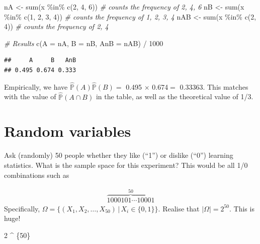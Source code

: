 \documentclass[
]{book}
\newenvironment{Shaded}{\begin{snugshade}}{\end{snugshade}}
\newcommand{\AttributeTok}[1]{\textcolor[rgb]{0.77,0.63,0.00}{#1}}
\newcommand{\CommentTok}[1]{\textcolor[rgb]{0.56,0.35,0.01}{\textit{#1}}}
\newcommand{\DecValTok}[1]{\textcolor[rgb]{0.00,0.00,0.81}{#1}}
\newcommand{\FunctionTok}[1]{\textcolor[rgb]{0.00,0.00,0.00}{#1}}
\newcommand{\NormalTok}[1]{#1}
\newcommand{\OtherTok}[1]{\textcolor[rgb]{0.56,0.35,0.01}{#1}}
\newcommand{\SpecialCharTok}[1]{\textcolor[rgb]{0.00,0.00,0.00}{#1}}
\newcommand{\bbP}{\mathbb{P}}
\theoremstyle{definition}
\theoremstyle{definition}
\theoremstyle{definition}
\theoremstyle{definition}
\theoremstyle{remark}
\begin{document}
\begin{Shaded}
\begin{Highlighting}[]
\NormalTok{nA }\OtherTok{\textless{}{-}} \FunctionTok{sum}\NormalTok{(x }\SpecialCharTok{\%in\%} \FunctionTok{c}\NormalTok{(}\DecValTok{2}\NormalTok{, }\DecValTok{4}\NormalTok{, }\DecValTok{6}\NormalTok{))  }\CommentTok{\# counts the frequency of 2, 4, 6}
\NormalTok{nB }\OtherTok{\textless{}{-}} \FunctionTok{sum}\NormalTok{(x }\SpecialCharTok{\%in\%} \FunctionTok{c}\NormalTok{(}\DecValTok{1}\NormalTok{, }\DecValTok{2}\NormalTok{, }\DecValTok{3}\NormalTok{, }\DecValTok{4}\NormalTok{))  }\CommentTok{\# counts the frequency of 1, 2, 3, 4}
\NormalTok{nAB }\OtherTok{\textless{}{-}} \FunctionTok{sum}\NormalTok{(x }\SpecialCharTok{\%in\%} \FunctionTok{c}\NormalTok{(}\DecValTok{2}\NormalTok{, }\DecValTok{4}\NormalTok{))  }\CommentTok{\# counts the frequency of 2, 4}

\CommentTok{\# Results}
\FunctionTok{c}\NormalTok{(}\AttributeTok{A =}\NormalTok{ nA, }\AttributeTok{B =}\NormalTok{ nB, }\AttributeTok{AnB =}\NormalTok{ nAB) }\SpecialCharTok{/} \DecValTok{1000}
\end{Highlighting}
\end{Shaded}

\begin{verbatim}
##     A     B   AnB 
## 0.495 0.674 0.333
\end{verbatim}

Empirically, we have \(\hat{\bbP}(A)\hat{\bbP}(B) =\) 0.495 \(\times\) 0.674\(=\) 0.33363.
This matches with the value of \(\hat{\bbP}(A \cap B)\) in the table, as well as the theoretical value of 1/3.

\hypertarget{random-variables}{%
\section{Random variables}\label{random-variables}}

Ask (randomly) 50 people whether they like (``1'') or dislike (``0'') learning statistics.
What is the sample space for this experiment?
This would be all 1/0 combinations such as

\begin{align*}
\overbrace{1000101\cdots 10001}^{50}
\end{align*}
Specifically, \(\Omega = \big\{(X_1,X_2,\dots,X_{50}) \,|\, X_i \in \{0,1\} \big\}\). Realise that \(|\Omega| = 2^{50}\). This is huge!

\begin{Shaded}
\begin{Highlighting}[]
\DecValTok{2} \SpecialCharTok{\^{}}\NormalTok{ \{}\DecValTok{50}\NormalTok{\}}
\end{Highlighting}
\end{Shaded}
\end{document}
